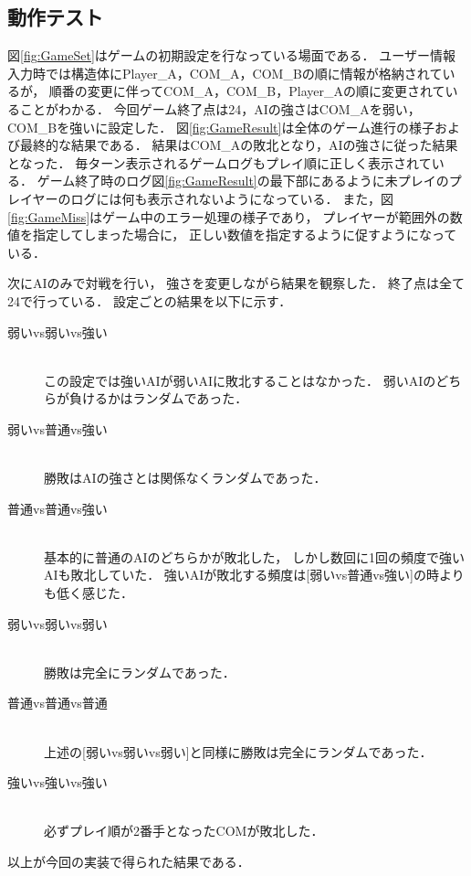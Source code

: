 \documentclass[a4paper,10pt]{jsarticle}
\begin{document}
\subsection{動作テスト}
図\ref{fig:GameSet}はゲームの初期設定を行なっている場面である．
ユーザー情報入力時では構造体にPlayer\_A，COM\_A，COM\_Bの順に情報が格納されているが，
順番の変更に伴ってCOM\_A，COM\_B，Player\_Aの順に変更されていることがわかる．
今回ゲーム終了点は24，AIの強さはCOM\_Aを弱い，COM\_Bを強いに設定した．
図\ref{fig:GameResult}は全体のゲーム進行の様子および最終的な結果である．
結果はCOM\_Aの敗北となり，AIの強さに従った結果となった．
毎ターン表示されるゲームログもプレイ順に正しく表示されている．
ゲーム終了時のログ図\ref{fig:GameResult}の最下部にあるように未プレイのプレイヤーのログには何も表示されないようになっている．
また，図\ref{fig:GameMiss}はゲーム中のエラー処理の様子であり，
プレイヤーが範囲外の数値を指定してしまった場合に，
正しい数値を指定するように促すようになっている．\par
次にAIのみで対戦を行い，
強さを変更しながら結果を観察した．
終了点は全て24で行っている．
設定ごとの結果を以下に示す．
\begin{description}
  \item[弱いvs弱いvs強い]\mbox{}\\
  この設定では強いAIが弱いAIに敗北することはなかった．
  弱いAIのどちらが負けるかはランダムであった．
  \item[弱いvs普通vs強い]\mbox{}\\
  勝敗はAIの強さとは関係なくランダムであった．
  \item[普通vs普通vs強い]\mbox{}\\
  基本的に普通のAIのどちらかが敗北した，
  しかし数回に1回の頻度で強いAIも敗北していた．
  強いAIが敗北する頻度は[弱いvs普通vs強い]の時よりも低く感じた．
  \item[弱いvs弱いvs弱い]\mbox{}\\
  勝敗は完全にランダムであった．
  \item[普通vs普通vs普通]\mbox{}\\
  上述の[弱いvs弱いvs弱い]と同様に勝敗は完全にランダムであった．
  \item[強いvs強いvs強い]\mbox{}\\
  必ずプレイ順が2番手となったCOMが敗北した．
\end{description}
以上が今回の実装で得られた結果である．
\end{document}
